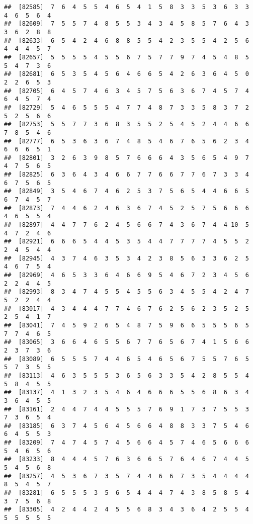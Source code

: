 \documentclass[
]{book}
\begin{document}
\begin{verbatim}
##  [82585]  7  6  4  5  5  4  6  5  4  1  5  8  3  3  5  3  6  3  3  4  6  5  6  4
##  [82609]  7  5  5  7  4  8  5  5  3  4  3  4  5  8  5  7  6  4  3  3  6  2  8  8
##  [82633]  6  5  4  2  4  6  8  8  5  5  4  2  3  5  5  4  2  5  6  4  4  4  5  7
##  [82657]  5  5  5  5  4  5  5  6  7  5  7  7  9  7  4  5  4  8  5  5  4  7  3  6
##  [82681]  6  5  3  5  4  5  6  4  6  6  5  4  2  6  3  6  4  5  0  2  2  6  5  3
##  [82705]  6  4  5  7  4  6  3  4  5  7  5  6  3  6  7  4  5  7  4  6  4  5  7  4
##  [82729]  5  4  6  5  5  5  4  7  7  4  8  7  3  3  5  8  3  7  2  5  2  5  6  6
##  [82753]  5  5  7  7  3  6  8  3  5  5  2  5  4  5  2  4  4  6  6  7  8  5  4  6
##  [82777]  6  5  3  6  3  6  7  4  8  5  4  6  7  6  5  6  2  3  4  6  6  6  5  1
##  [82801]  3  2  6  3  9  8  5  7  6  6  6  4  3  5  6  5  4  9  7  4  7  5  6  5
##  [82825]  6  3  6  4  3  4  6  6  7  7  6  6  7  7  6  7  3  3  4  6  7  5  6  5
##  [82849]  3  5  4  6  7  4  6  2  5  3  7  5  6  5  4  4  6  6  5  6  7  4  5  7
##  [82873]  7  4  4  6  2  4  6  3  6  7  4  5  2  5  7  5  6  6  6  4  6  5  5  4
##  [82897]  4  4  7  7  6  2  4  5  6  6  7  4  3  6  7  4  4 10  5  4  7  2  4  6
##  [82921]  6  6  6  5  4  4  5  3  5  4  4  7  7  7  7  4  5  5  2  2  4  5  4  4
##  [82945]  4  3  7  4  6  3  5  3  4  2  3  8  5  6  3  3  6  2  5  4  6  7  5  4
##  [82969]  4  6  5  3  3  6  4  6  6  9  5  4  6  7  2  3  4  5  6  2  2  4  4  5
##  [82993]  8  3  4  7  4  5  5  4  5  5  6  3  4  5  5  4  2  4  7  5  2  2  4  4
##  [83017]  4  3  4  4  4  7  7  4  6  7  6  2  5  6  2  3  5  2  5  2  5  4  1  7
##  [83041]  7  4  5  9  2  6  5  4  8  7  5  9  6  6  5  5  5  6  5  7  7  4  6  5
##  [83065]  3  6  6  4  6  5  5  6  7  7  6  5  6  7  4  1  5  6  6  2  3  7  3  6
##  [83089]  6  5  5  5  7  4  4  6  5  4  6  5  6  7  5  5  7  6  5  5  7  3  5  5
##  [83113]  4  6  3  5  5  5  3  6  5  6  3  3  5  4  2  8  5  5  4  5  8  4  5  5
##  [83137]  4  1  3  2  3  5  4  6  4  6  6  6  5  5  6  8  6  3  4  3  6  4  5  5
##  [83161]  2  4  4  7  4  4  5  5  5  7  6  9  1  7  3  7  5  5  3  7  3  6  5  4
##  [83185]  6  3  7  4  5  6  4  5  6  6  4  8  8  3  3  7  5  4  6  6  4  5  5  3
##  [83209]  7  4  7  4  5  7  4  5  6  6  4  5  7  4  6  5  6  6  6  5  4  6  5  6
##  [83233]  8  4  4  4  5  7  6  3  6  6  5  7  6  4  6  7  4  4  5  5  4  5  6  8
##  [83257]  4  5  3  6  7  3  5  7  4  4  6  6  7  3  5  4  4  4  4  8  5  4  5  7
##  [83281]  6  5  5  5  3  5  6  5  4  4  4  7  4  3  8  5  8  5  4  3  7  5  6  8
##  [83305]  4  2  4  4  2  4  5  5  6  8  3  4  3  6  4  2  5  5  4  5  5  5  5  5

\end{verbatim}
\end{document}
